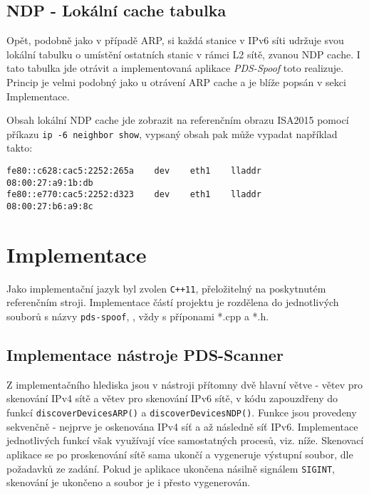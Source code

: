 \documentclass[a4paper, 11pt]{article}
\begin{document}
\subsection{NDP \-- Lokální cache tabulka}
\indent\par{Opět, podobně jako v případě ARP, si každá stanice v IPv6 síti udržuje svou lokální tabulku o umístění ostatních stanic v rámci L2 sítě, zvanou NDP cache. I tato tabulka jde otrávit a implementovaná aplikace \textit{PDS-Spoof} toto realizuje. Princip je velmi podobný jako u otrávení ARP cache a je blíže popsán v sekci Implementace.}

\par{Obsah lokální NDP cache jde zobrazit na referenčním obrazu ISA2015 pomocí příkazu \texttt{ip -6 neighbor show}, vypsaný obsah pak může vypadat například takto:}
\begin{Verbatim}
fe80::c628:cac5:2252:265a    dev    eth1    lladdr    08:00:27:a9:1b:db
fe80::e770:cac5:2252:d323    dev    eth1    lladdr    08:00:27:b6:a9:8c
\end{Verbatim}



\section{Implementace}
\par{Jako implementační jazyk byl zvolen \texttt{C++11}, přeložitelný na poskytnutém referenčním stroji. Implementace částí projektu je rozdělena do jednotlivých souborů s názvy \texttt{pds-spoof}, , vždy s příponami *.cpp a *.h.}

\subsection{Implementace nástroje PDS-Scanner}
	\par{Z implementačního hlediska jsou v nástroji přítomny dvě hlavní větve - větev pro skenování IPv4 sítě a větev pro skenování IPv6 sítě, v kódu zapouzdřeny do funkcí \texttt{discoverDevicesARP()} a \texttt{discoverDevicesNDP()}. Funkce jsou provedeny sekvenčně \-- nejprve je oskenována IPv4 síť a až následně síť IPv6. Implementace jednotlivých funkcí však využívají více samostatných procesů, viz. níže. Skenovací aplikace se po proskenování sítě sama ukončí a vygeneruje výstupní soubor, dle požadavků ze zadání. Pokud je aplikace ukončena násilně signálem \texttt{SIGINT}, skenování je ukončeno a soubor je i přesto vygenerován.}
\end{document}
